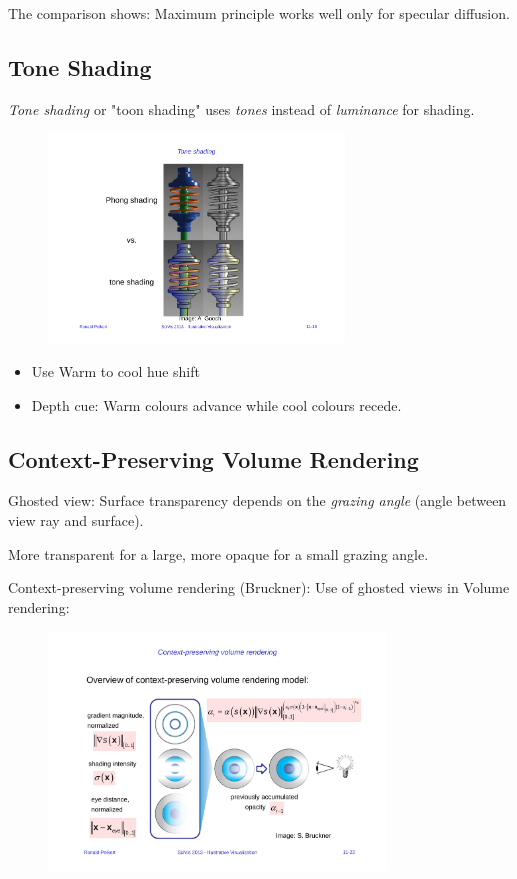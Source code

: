 The comparison shows: Maximum principle works well only for specular diffusion.

\subsection{Tone Shading}
\emph{Tone shading} or "toon shading" uses \emph{tones} instead of \emph{luminance} for shading.

\begin{figure}[H]
\centering
\includegraphics[width=0.7\textwidth]{img/11_tone_shading}
\end{figure}

\begin{itemize}
\item Use Warm to cool hue shift
\item Depth cue: Warm colours advance while cool colours recede.
\end{itemize}

\subsection{Context-Preserving Volume Rendering}
Ghosted view: Surface transparency depends on the \emph{grazing angle} (angle between view ray and surface). 

More transparent for a large, more opaque for a small grazing angle. 

Context-preserving volume rendering (Bruckner):
 Use of ghosted views in Volume rendering:
\begin{figure}[H]
\centering
\includegraphics[width=0.8\textwidth,page=1]{img/11_bruckner}
\end{figure}

